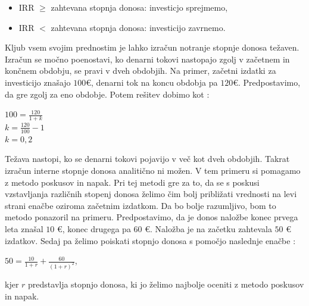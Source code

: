 \begin{itemize}
\item IRR $\geq$ zahtevana stopnja donosa: investicjo sprejmemo,
\item IRR $<$ zahtevana stopnja donosa: investicijo zavrnemo.
\end{itemize}


Kljub vsem svojim prednostim je lahko izračun notranje stopnje donosa težaven. Izračun se močno poenostavi, ko denarni tokovi nastopajo zgolj v začetnem in končnem obdobju, se pravi v dveh obdobjih. Na primer, začetni izdatki za investicijo znašajo $100$€, denarni tok na koncu obdobja pa $120$€. Predpostavimo, da gre zgolj za eno obdobje. Potem rešitev dobimo kot \cite[str. 157]{Mramor}:\\

\begin{center}
$100 = \tfrac{120}{1+k}$\\[0,5cm]
$k = \tfrac{120}{100} - 1$\\[0,5 cm]
$k = 0,2$
\end{center}

Težava nastopi, ko se denarni tokovi pojavijo v več kot dveh obdobjih. Takrat izračun interne stopnje donosa analitično ni možen. V tem primeru si pomagamo z metodo poskusov in napak. Pri tej metodi gre za to, da se s poskusi vzstavljanja različnih stopenj donosa želimo čim bolj približati vrednosti na levi strani enačbe oziroma začetnim izdatkom. Da bo bolje razumljivo, bom to metodo ponazoril na primeru. Predpostavimo, da je donos naložbe konec prvega leta znašal $10$ €, konec drugega pa $60$ €. Naložba je na začetku zahtevala $50$ € izdatkov. Sedaj pa želimo poiskati stopnjo donosa s pomočjo naslednje enačbe \cite[str. 158]{Mramor}:\\

\begin{center}
$50 = \tfrac{10}{1+r} + \tfrac{60}{(1+r)^2}$,
\end{center}
kjer $r$ predstavlja stopnjo donosa, ki jo želimo najbolje oceniti z metodo poskusov in napak.

